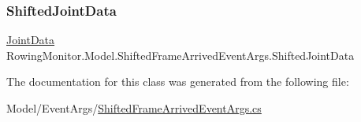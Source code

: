 \subsubsection{\texorpdfstring{Shifted\+Joint\+Data}{ShiftedJointData}}
{\footnotesize\ttfamily \hyperlink{struct_rowing_monitor_1_1_model_1_1_util_1_1_joint_data}{Joint\+Data} Rowing\+Monitor.\+Model.\+Shifted\+Frame\+Arrived\+Event\+Args.\+Shifted\+Joint\+Data\hspace{0.3cm}{\ttfamily [get]}}



The documentation for this class was generated from the following file\+:\begin{DoxyCompactItemize}
\item 
Model/\+Event\+Args/\hyperlink{_shifted_frame_arrived_event_args_8cs}{Shifted\+Frame\+Arrived\+Event\+Args.\+cs}\end{DoxyCompactItemize}
